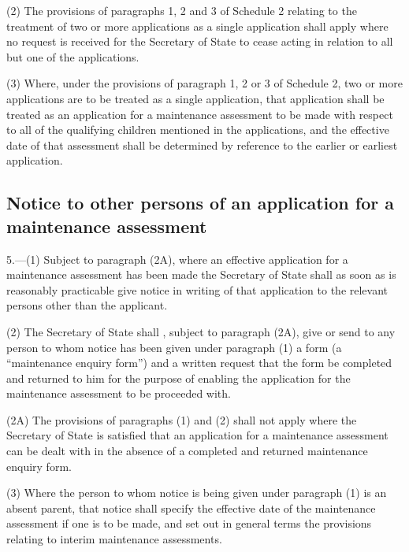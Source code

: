\documentclass[a4paper,12pt]{article}
\begin{document}
(2) The provisions of paragraphs 1, 2 and 3 of Schedule 2 relating to the treatment of two or more applications as a single application shall apply where no request is received for the Secretary of State to cease acting in relation to all but one of the applications.

(3) Where, under the provisions of paragraph 1, 2 or 3 of Schedule 2, two or more applications are to be treated as a single application, that application shall be treated as an application for a maintenance assessment to be made with respect to all of the qualifying children mentioned in the applications, and the effective date of that assessment shall be determined by reference to the earlier or earliest application.

\subsection[5. Notice to other persons of an application for a maintenance assessment]{Notice to other persons of an application for a maintenance assessment}

5.—(1) 
Subject to paragraph (2A), where %
an effective application for a maintenance assessment has been made the Secretary of State shall as soon as is reasonably practicable give notice in writing of that application to the relevant persons other than the applicant.

(2) The Secretary of State shall%
, subject to paragraph (2A), %
 give or send to any person to whom notice has been given under paragraph (1) a form (a “maintenance enquiry form”) and a written request that the form be completed and returned to him for the purpose of enabling the application for the maintenance assessment to be proceeded with.

(2A) The provisions of paragraphs (1) and (2) shall not apply where the Secretary of State is satisfied that an application for a maintenance assessment can be dealt with in the absence of a completed and returned maintenance enquiry form. %

(3) Where the person to whom notice is being given under paragraph (1) is an absent parent, that notice shall specify the effective date of the maintenance assessment if one is to be made, and set out in general terms the provisions relating to interim maintenance assessments.
\end{document}
